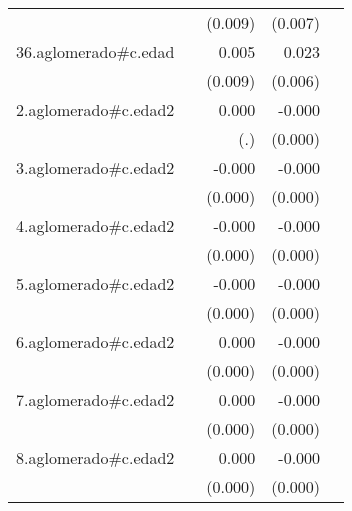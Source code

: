 {\begin{longtable}{l*{4}{D{.}{.}{-1}}}
            &                     &     (0.009)         &     (0.007)         &                     \\
\addlinespace
36.aglomerado#c.edad&                     &       0.005         &       0.023\sym{***}&                     \\
            &                     &     (0.009)         &     (0.006)         &                     \\
\addlinespace
2.aglomerado#c.edad2&                     &       0.000         &      -0.000         &                     \\
            &                     &         (.)         &     (0.000)         &                     \\
\addlinespace
3.aglomerado#c.edad2&                     &      -0.000         &      -0.000\sym{***}&                     \\
            &                     &     (0.000)         &     (0.000)         &                     \\
\addlinespace
4.aglomerado#c.edad2&                     &      -0.000         &      -0.000\sym{***}&                     \\
            &                     &     (0.000)         &     (0.000)         &                     \\
\addlinespace
5.aglomerado#c.edad2&                     &      -0.000         &      -0.000\sym{**} &                     \\
            &                     &     (0.000)         &     (0.000)         &                     \\
\addlinespace
6.aglomerado#c.edad2&                     &       0.000         &      -0.000         &                     \\
            &                     &     (0.000)         &     (0.000)         &                     \\
\addlinespace
7.aglomerado#c.edad2&                     &       0.000         &      -0.000         &                     \\
            &                     &     (0.000)         &     (0.000)         &                     \\
\addlinespace
8.aglomerado#c.edad2&                     &       0.000         &      -0.000         &                     \\
            &                     &     (0.000)         &     (0.000)         &                     \\

\end{longtable}}

